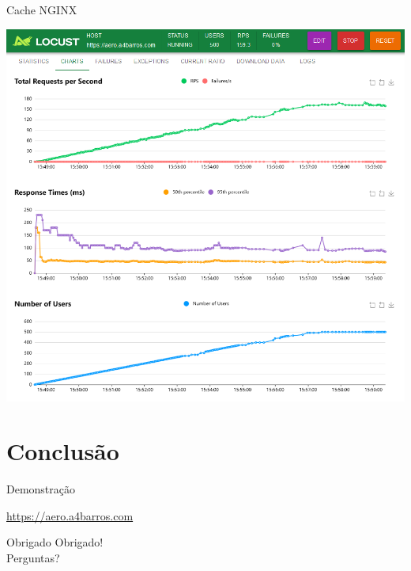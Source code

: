\documentclass{beamer}
\begin{document}
\begin{frame}{Cache NGINX}
    \begin{center}
    \includegraphics[width=0.6\linewidth]{img/locust-cache.png}
    \end{center}
\end{frame}


\section{Conclusão}
\begin{frame}{Demonstração}
    \begin{center}
        \url{https://aero.a4barros.com}
    \end{center}
\end{frame}

\begin{frame}{Obrigado}
    \centering
    \Huge Obrigado! \\
    \normalsize Perguntas?
\end{frame}
\end{document}
